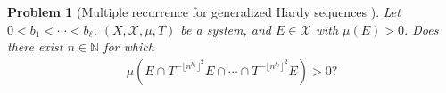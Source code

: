 \documentclass[11pt]{amsart}
\newtheorem{problem}{Problem}
\theoremstyle{definition}
\DeclareMathOperator*{\E}{\mathbb{E}}
\newcommand{\N}{{\mathbb N}}
\newcommand{\Z}{{\mathbb Z}}
\newcommand{\CX}{{\mathcal X}}
\newcommand{\1}{{\mathbf{1}}}
\newcommand{\sfloor}[1]{{\lfloor #1 \rfloor}}
\begin{document}
    \begin{problem}[Multiple recurrence for generalized Hardy sequences {\cite[Conjecture 3]{Ts22}}]
        Let $0<b_1 < \cdots < b_\ell$, $(X, \CX, \mu, T)$ be a system, and $E\in\CX$ with $\mu(E)>0$. Does there exist $n\in\N$ for which 
            \begin{align*}
               \mu(E\cap T^{-\sfloor{n^{b_1}}^2}E\cap\cdots \cap T^{-\sfloor{n^{b_\ell}}^2}E)>0?
            \end{align*}
    \end{problem}
\end{document}
